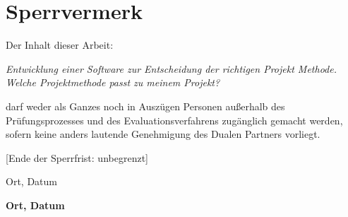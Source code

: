 \chapter*{Sperrvermerk}
Der Inhalt dieser Arbeit: 

\textit{\glqq Entwicklung  einer Software zur Entscheidung der richtigen Projekt Methode. Welche Projektmethode passt zu meinem Projekt? \grqq{}}

darf weder als Ganzes noch in Auszügen Personen außerhalb des Prüfungsprozesses und des Evaluationsverfahrens zugänglich gemacht werden, sofern keine anders lautende Genehmigung des Dualen Partners vorliegt. 

[Ende der Sperrfrist: unbegrenzt]

\vspace{3cm}
Ort, Datum

\textbf{Ort, Datum} \hfill \DerAutorDerArbeit

\cleardoublepage

